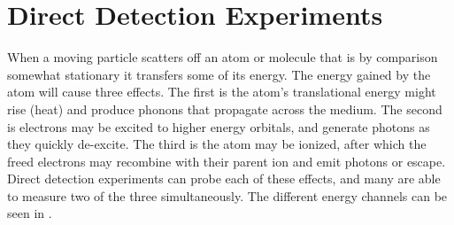 

















\section[Direct Detection Experiments][Direct Detection Experiments]{Direct Detection Experiments}
\label{sec:direct_detect}
When a moving particle scatters off an atom or molecule that is by comparison somewhat stationary it transfers some of its
energy.  The energy gained by the atom will cause three effects.  The first is the atom's translational energy might rise (heat) and
produce phonons that propagate across the medium.  The second is electrons may be excited to higher energy orbitals, and generate
photons
as they quickly de-excite.  The third is the atom may be ionized, after which the freed electrons may recombine with their parent ion
and emit photons or escape.  Direct detection experiments can probe each of these effects, and many are able to measure two of the three
simultaneously.  The different energy channels can be seen in .

